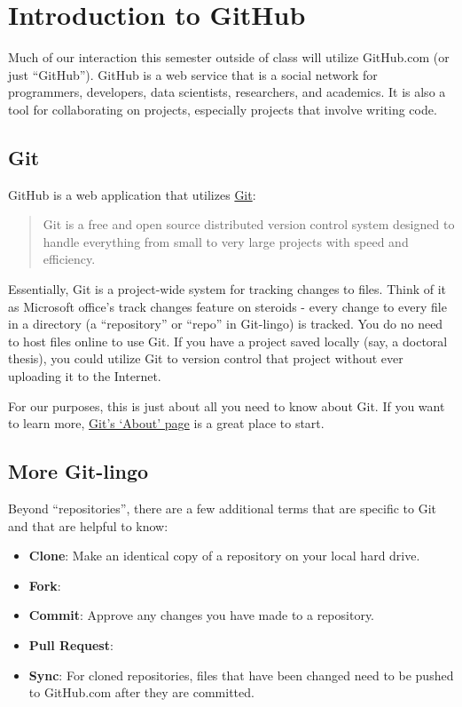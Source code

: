 \documentclass[]{book}
\providecommand{\tightlist}{%
  \setlength{\itemsep}{0pt}\setlength{\parskip}{0pt}}
\begin{document}
\chapter{Introduction to GitHub}\label{introduction-to-github}

Much of our interaction this semester outside of class will utilize
GitHub.com (or just ``GitHub''). GitHub is a web service that is a
social network for programmers, developers, data scientists,
researchers, and academics. It is also a tool for collaborating on
projects, especially projects that involve writing code.

\section{Git}\label{git}

GitHub is a web application that utilizes
\href{https://git-scm.com}{Git}:

\begin{quote}
Git is a free and open source distributed version control system
designed to handle everything from small to very large projects with
speed and efficiency.
\end{quote}

Essentially, Git is a project-wide system for tracking changes to files.
Think of it as Microsoft office's track changes feature on steroids -
every change to every file in a directory (a ``repository'' or ``repo''
in Git-lingo) is tracked. You do no need to host files online to use
Git. If you have a project saved locally (say, a doctoral thesis), you
could utilize Git to version control that project without ever uploading
it to the Internet.

For our purposes, this is just about all you need to know about Git. If
you want to learn more, \href{https://git-scm.com/about}{Git's `About'
page} is a great place to start.

\section{More Git-lingo}\label{more-git-lingo}

Beyond ``repositories'', there are a few additional terms that are
specific to Git and that are helpful to know:

\begin{itemize}
\tightlist
\item
  \textbf{Clone}: Make an identical copy of a repository on your local
  hard drive.
\item
  \textbf{Fork}:
\item
  \textbf{Commit}: Approve any changes you have made to a repository.
\item
  \textbf{Pull Request}:
\item
  \textbf{Sync}: For cloned repositories, files that have been changed
  need to be pushed to GitHub.com after they are committed.
\end{itemize}
\end{document}
